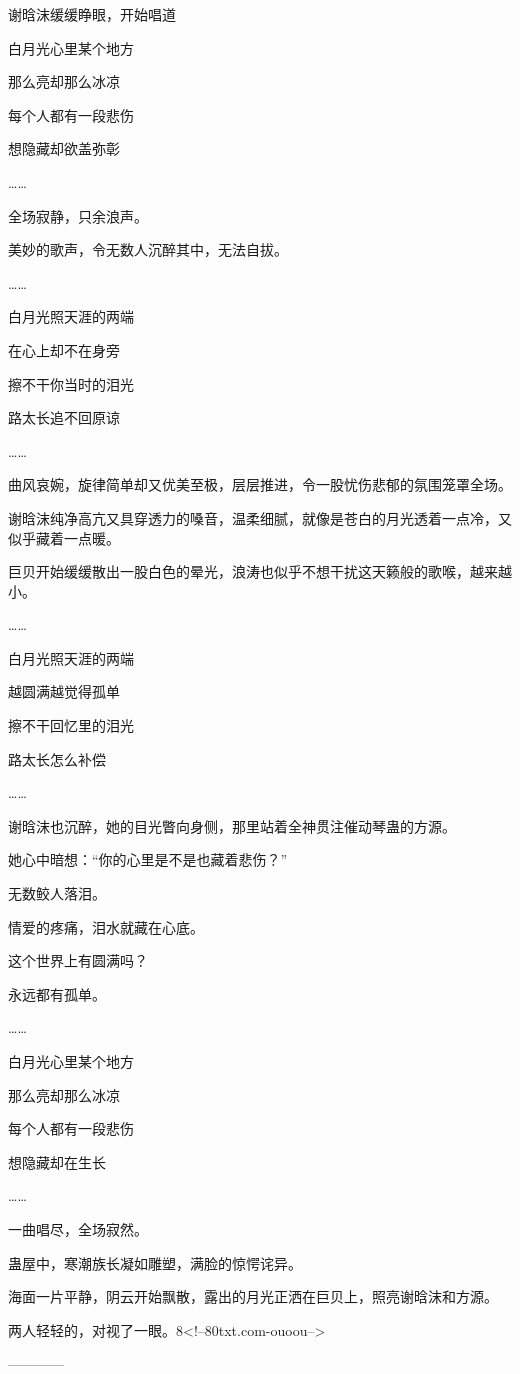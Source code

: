 \begin{this_body}
谢晗沫缓缓睁眼，开始唱道

白月光心里某个地方

那么亮却那么冰凉

每个人都有一段悲伤

想隐藏却欲盖弥彰

……

全场寂静，只余浪声。

美妙的歌声，令无数人沉醉其中，无法自拔。

……

白月光照天涯的两端

在心上却不在身旁

擦不干你当时的泪光

路太长追不回原谅

……

曲风哀婉，旋律简单却又优美至极，层层推进，令一股忧伤悲郁的氛围笼罩全场。

谢晗沫纯净高亢又具穿透力的嗓音，温柔细腻，就像是苍白的月光透着一点冷，又似乎藏着一点暖。

巨贝开始缓缓散出一股白色的晕光，浪涛也似乎不想干扰这天籁般的歌喉，越来越小。

……

白月光照天涯的两端

越圆满越觉得孤单

擦不干回忆里的泪光

路太长怎么补偿

……

谢晗沫也沉醉，她的目光瞥向身侧，那里站着全神贯注催动琴蛊的方源。

她心中暗想：“你的心里是不是也藏着悲伤？”

无数鲛人落泪。

情爱的疼痛，泪水就藏在心底。

这个世界上有圆满吗？

永远都有孤单。

……

白月光心里某个地方

那么亮却那么冰凉

每个人都有一段悲伤

想隐藏却在生长

……

一曲唱尽，全场寂然。

蛊屋中，寒潮族长凝如雕塑，满脸的惊愕诧异。

海面一片平静，阴云开始飘散，露出的月光正洒在巨贝上，照亮谢晗沫和方源。

两人轻轻的，对视了一眼。8<!--80txt.com-ouoou-->

------------

\end{this_body}

